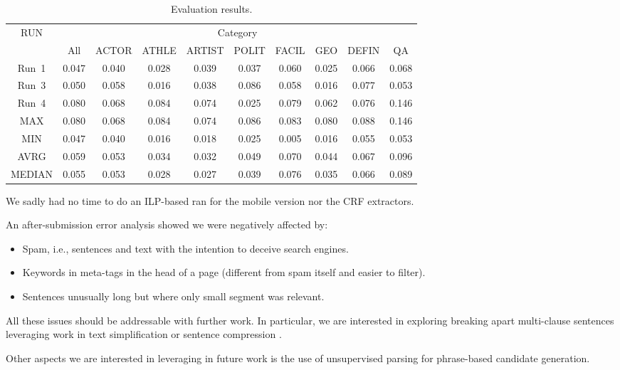 \begin{table*}
\centering
\begin{tabular}{|c|c|c|c|c|c|c|c|c|c|}
\hline
RUN & \multicolumn{9}{|c|}{Category}\\
\cline{2-10}
 & All  & ACTOR  & ATHLE  & ARTIST  & POLIT  & FACIL  & GEO  & DEFIN  & QA \\
\hline
\hline
Run~1 & 0.047& 0.040& 0.028& 0.039& 0.037& 0.060& 0.025& 0.066& 0.068 \\

\cline{1-10}

Run~3 & 0.050& 0.058& 0.016& 0.038& 0.086& 0.058& 0.016& 0.077& 0.053 \\

\cline{1-10}

Run~4 & 0.080& 0.068& 0.084& 0.074& 0.025& 0.079& 0.062& 0.076& 0.146 \\

\cline{1-10}

MAX & 0.080& 0.068& 0.084& 0.074& 0.086& 0.083& 0.080& 0.088& 0.146 \\

\cline{1-10}

MIN & 0.047& 0.040& 0.016& 0.018& 0.025& 0.005& 0.016& 0.055& 0.053 \\

\cline{1-10}

AVRG & 0.059& 0.053& 0.034& 0.032& 0.049& 0.070& 0.044& 0.067& 0.096 \\

\cline{1-10}

MEDIAN & 0.055& 0.053& 0.028& 0.027& 0.039& 0.076& 0.035& 0.066& 0.089 \\

\cline{1-10}
\end{tabular}
\caption{Evaluation results.}
\label{tab:eval}
\end{table*}



We sadly had no time to do an ILP-based ran for the mobile version nor
the CRF extractors. 

An after-submission error analysis showed we were negatively affected
by:

\begin{itemize}
\item Spam, i.e., sentences and text with the intention to deceive search engines.
\item Keywords in meta-tags in the head of a page (different from spam itself and easier to filter).
\item Sentences unusually long but where only small segment was relevant.
\end{itemize}

All these issues should be addressable with further work. In
particular, we are interested in exploring breaking apart multi-clause
sentences leveraging work in text simplification
\cite{siddharthan2006syntactic} or sentence compression
\cite{clarke2008global}.

Other aspects we are interested in leveraging in future work is the
use of unsupervised parsing \cite{seginer_etal_ACL07} for phrase-based
candidate generation.

